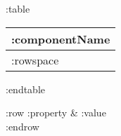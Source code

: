 :table
\begin{table}[H]
\begin{center}
\begin{tabular}{p{\tabellenzweispaltenbreiteerste} p{\tabellenzweispaltenbreitezweite}}
    \multicolumn{2}{c}{
        \cellcolor{\mtabellenkopfhintergrundfarbe}         
             \textcolor{\mtabellenkopfschriftfarbe}{\textbf{:componentName}}
        } \\ \hline
        :rowspace
\end{tabular}
\end{center}
\end{table}
:endtable

:row                
    \cellcolor{\mtabellenhintergrund} :property & :value \\ \hline
:endrow